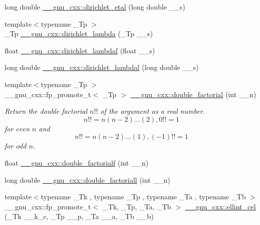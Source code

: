 \begin{DoxyCompactItemize}
\item 
long double \hyperlink{group__gnu__math__spec__func_ga408e2267b648f29445522dbafb7a0e1a}{\+\_\+\+\_\+gnu\+\_\+cxx\+::dirichlet\+\_\+etal} (long double \+\_\+\+\_\+s)
\item 
{\footnotesize template$<$typename \+\_\+\+Tp $>$ }\\\+\_\+\+Tp \hyperlink{group__gnu__math__spec__func_ga06842a81bdcabf9c62252dde992d42ee}{\+\_\+\+\_\+gnu\+\_\+cxx\+::dirichlet\+\_\+lambda} (\+\_\+\+Tp \+\_\+\+\_\+s)
\item 
float \hyperlink{group__gnu__math__spec__func_gaafd3ca6b0d71d55d3835536396eece8f}{\+\_\+\+\_\+gnu\+\_\+cxx\+::dirichlet\+\_\+lambdaf} (float \+\_\+\+\_\+s)
\item 
long double \hyperlink{group__gnu__math__spec__func_gab28d06c4e3c7457f1fa3663168678fb2}{\+\_\+\+\_\+gnu\+\_\+cxx\+::dirichlet\+\_\+lambdal} (long double \+\_\+\+\_\+s)
\item 
{\footnotesize template$<$typename \+\_\+\+Tp $>$ }\\\+\_\+\+\_\+gnu\+\_\+cxx\+::fp\+\_\+promote\+\_\+t$<$ \+\_\+\+Tp $>$ \hyperlink{group__gnu__math__spec__func_ga1e62c47f84f9782828f8830b4fedc13c}{\+\_\+\+\_\+gnu\+\_\+cxx\+::double\+\_\+factorial} (int \+\_\+\+\_\+n)
\begin{DoxyCompactList}\small\item\em Return the double factorial $ n!! $ of the argument as a real number. \[ n!! = n(n-2)...(2), 0!! = 1 \] for even $ n $ and \[ n!! = n(n-2)...(1), (-1)!! = 1 \] for odd $ n $. \end{DoxyCompactList}\item 
float \hyperlink{group__gnu__math__spec__func_ga85ec284e603f32d18970bbdbb12d5150}{\+\_\+\+\_\+gnu\+\_\+cxx\+::double\+\_\+factorialf} (int \+\_\+\+\_\+n)
\item 
long double \hyperlink{group__gnu__math__spec__func_ga0366730a4a775256217ef1cd9d0c3a04}{\+\_\+\+\_\+gnu\+\_\+cxx\+::double\+\_\+factoriall} (int \+\_\+\+\_\+n)
\item 
{\footnotesize template$<$typename \+\_\+\+Tk , typename \+\_\+\+Tp , typename \+\_\+\+Ta , typename \+\_\+\+Tb $>$ }\\\+\_\+\+\_\+gnu\+\_\+cxx\+::fp\+\_\+promote\+\_\+t$<$ \+\_\+\+Tk, \+\_\+\+Tp, \+\_\+\+Ta, \+\_\+\+Tb $>$ \hyperlink{group__gnu__math__spec__func_ga6e44a0d90500e56ef4b3aba6efd7e2b0}{\+\_\+\+\_\+gnu\+\_\+cxx\+::ellint\+\_\+cel} (\+\_\+\+Tk \+\_\+\+\_\+k\+\_\+c, \+\_\+\+Tp \+\_\+\+\_\+p, \+\_\+\+Ta \+\_\+\+\_\+a, \+\_\+\+Tb \+\_\+\+\_\+b)
\item 

\end{DoxyCompactItemize}
